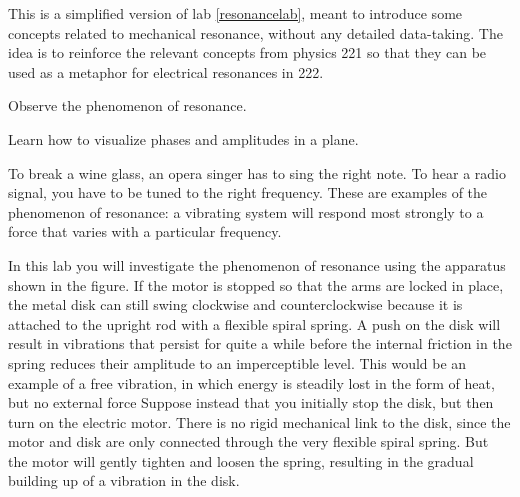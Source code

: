
This is a simplified version of lab \ref{resonancelab}, meant to introduce
some concepts related to mechanical resonance, without any
detailed data-taking. The idea is to reinforce the relevant concepts
from physics 221 so that they can be used as a metaphor for electrical
resonances in 222.

\apparatus
{}

\begin{goals}

\item[] Observe the phenomenon of resonance.

\item[] Learn how to visualize phases and amplitudes in a plane.
\end{goals}

\introduction

To break a wine glass, an opera singer has to sing the right
note. To hear a radio signal, you have to be tuned to the
right frequency. These are examples of the phenomenon of
resonance: a vibrating system will respond most strongly to
a force that varies with a particular frequency.


\apparatus
In this lab you will investigate the phenomenon of resonance
using the apparatus shown in the figure. If the motor is
stopped so that the arms are locked in place, the metal disk
can still swing clockwise and counterclockwise because it is
attached to the upright rod with a flexible spiral spring. A
push on the disk will result in vibrations that persist for
quite a while before the internal friction in the spring
reduces their amplitude to an imperceptible level. This
would be an example of a free vibration, in which energy is
steadily lost in the form of heat, but no external force
Suppose instead that you initially stop the disk, but then
turn on the electric motor. There is no rigid mechanical
link to the disk, since the motor and disk are only
connected through the very flexible spiral spring. But the
motor will gently tighten and loosen the spring, resulting
in the gradual building up of a vibration in the disk.

